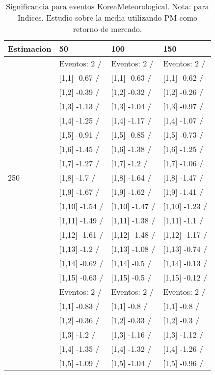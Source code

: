\begin{table}

\caption{Significancia para eventos KoreaMeteorological. Nota: para Indices. Estudio sobre la media utilizando PM como retorno de mercado.}
\centering
\begin{tabular}[t]{llll}
\toprule
Estimacion & 50 & 100 & 150\\
\midrule
 & Eventos:  2 / & Eventos:  2 / & Eventos:  2 /\\
 & {}[1,1] -0.67  / & {}[1,1] -0.63  / & {}[1,1] -0.62  /\\
 & {}[1,2] -0.39  / & {}[1,2] -0.32  / & {}[1,2] -0.26  /\\
 & {}[1,3] -1.13  / & {}[1,3] -1.04  / & {}[1,3] -0.97  /\\
 & {}[1,4] -1.25  / & {}[1,4] -1.17  / & {}[1,4] -1.07  /\\
\addlinespace
 & {}[1,5] -0.91  / & {}[1,5] -0.85  / & {}[1,5] -0.73  /\\
 & {}[1,6] -1.45  / & {}[1,6] -1.38  / & {}[1,6] -1.25  /\\
 & {}[1,7] -1.27  / & {}[1,7] -1.2  / & {}[1,7] -1.06  /\\
250 & {}[1,8] -1.7  / & {}[1,8] -1.64  / & {}[1,8] -1.47  /\\
 & {}[1,9] -1.67  / & {}[1,9] -1.62  / & {}[1,9] -1.41  /\\
\addlinespace
 & {}[1,10] -1.54  / & {}[1,10] -1.47  / & {}[1,10] -1.23  /\\
 & {}[1,11] -1.49  / & {}[1,11] -1.38  / & {}[1,11] -1.1  /\\
 & {}[1,12] -1.61  / & {}[1,12] -1.48  / & {}[1,12] -1.17  /\\
 & {}[1,13] -1.2  / & {}[1,13] -1.08  / & {}[1,13] -0.74  /\\
 & {}[1,14] -0.62  / & {}[1,14] -0.5  / & {}[1,14] -0.13  /\\
\addlinespace
 & {}[1,15] -0.63  / & {}[1,15] -0.5  / & {}[1,15] -0.12  /\\
 & Eventos:  2 / & Eventos:  2 / & Eventos:  2 /\\
 & {}[1,1] -0.83  / & {}[1,1] -0.8  / & {}[1,1] -0.8  /\\
 & {}[1,2] -0.36  / & {}[1,2] -0.33  / & {}[1,2] -0.3  /\\
 & {}[1,3] -1.2  / & {}[1,3] -1.16  / & {}[1,3] -1.12  /\\
\addlinespace
 & {}[1,4] -1.35  / & {}[1,4] -1.32  / & {}[1,4] -1.26  /\\
 & {}[1,5] -1.09  / & {}[1,5] -1.04  / & {}[1,5] -0.96  /\\

\end{tabular}
\end{table}
